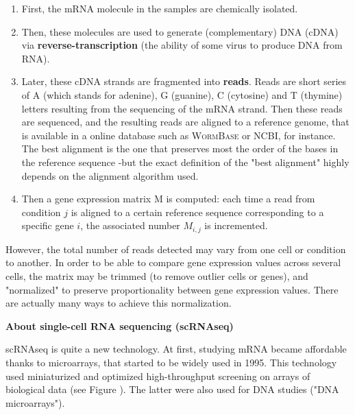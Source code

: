 \documentclass{report}
\begin{document}
\begin{enumerate}
\item First, the mRNA molecule in the samples are chemically isolated. 
\item Then, these molecules are used to generate (complementary) DNA (cDNA) via \textbf{reverse-transcription} (the ability of some virus to produce DNA from RNA). 
\item Later, these cDNA strands are fragmented into \textbf{reads}. Reads are short series of A (which stands for adenine), G (guanine), C (cytosine) and T (thymine) letters resulting from the sequencing of the mRNA strand. Then these reads are sequenced, and the resulting reads are aligned to a reference genome, that is available in a online database such as \textsc{WormBase}\cite{stein2001wormbase} or \textsc{NCBI}\cite{ncbi}, for instance. The best alignment is the one that preserves most the order of the bases in the reference sequence -but the exact definition of the "best alignment" highly depends on the alignment algorithm used. 
\item Then a gene expression matrix M is computed: each time a read from condition $j$ is aligned to a certain reference sequence corresponding to a specific gene $i$, the associated number $M_{i,j}$ is incremented.
\end{enumerate}

However, the total number of reads detected may vary from one cell or condition to another. In order to be able to compare gene expression values across several cells, the matrix may be trimmed (to remove outlier cells or genes), and "normalized" to preserve proportionality between gene expression values. There are actually many ways to achieve this normalization\cite{love2014moderated}\cite{chen2014differential}.


\bigskip
\noindent \textbf{About single-cell RNA sequencing (scRNAseq)}
\bigskip

scRNAseq is quite a new technology. At first, studying mRNA became affordable thanks to microarrays\cite{chang1983binding}, that started to be widely used in 1995\cite{schena1995quantitative}. This technology used miniaturized and optimized high-throughput screening on arrays of biological data\cite{microarraywiki} (see Figure \label{microarray}). The latter were also used for DNA studies ("DNA microarrays"\cite{southern2001dna}). 
\end{document}

